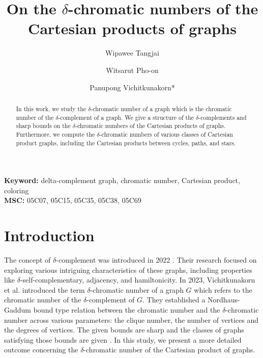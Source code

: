 \documentclass[12pt]{amsart}
\title{On the $\delta$-chromatic numbers of the Cartesian products of graphs}
\author{Wipawee Tangjai}
\author{Witsarut Pho-on}
\author{Panupong Vichitkunakorn*}
\begin{document}
\maketitle
\begin{abstract}
In this work, we study the $\delta$-chromatic number of a graph which is the chromatic number of the $\delta$-complement of a graph. 
We give a structure of the $\delta$-complements and sharp bounds on the $\delta$-chromatic numbers of the Cartesian products of graphs.
Furthermore, we compute the $\delta$-chromatic numbers of various classes of Cartesian product graphs, including the Cartesian products between cycles, paths, and stars.

\end{abstract}
\textbf{Keyword:}
delta-complement graph, chromatic number, Cartesian product,  coloring
\\
\textbf{MSC:} 05C07, 05C15, 05C35, 05C38, 05C69


\section{Introduction}
The concept of $\delta$-complement was introduced in 2022 \cite{math10081203}. Their research focused on exploring various intriguing characteristics of these graphs, including properties like $\delta$-self-complementary, adjacency, and hamiltonicity.
In 2023, Vichitkunakorn et al. \cite{Vichitkunakorn2023} introduced the term $\delta$-chromatic number of a graph $G$ which refers to the chromatic number of the $\delta$-complement of $G$.
They established a Nordhaus-Gaddum bound type relation between the chromatic number and the $\delta$-chromatic number across various parameters: the clique number, the number of vertices and the degrees of vertices.
The given bounds are sharp and the classes of graphs satisfying those bounds are given
\cite{Vichitkunakorn2023}.
In this study, we present a more detailed outcome concerning the $\delta$-chromatic number of the Cartesian product of graphs.
\end{document}
